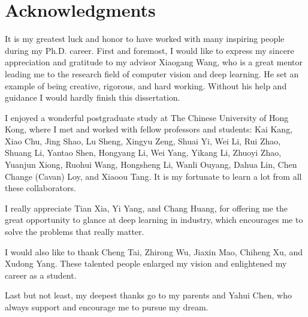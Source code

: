 \chapter*{Acknowledgments}

It is my greatest luck and honor to have worked with many inspiring people during my Ph.D. career. First and foremost, I would like to express my sincere appreciation and gratitude to my advisor Xiaogang Wang, who is a great mentor leading me to the research field of computer vision and deep learning. He set an example of being creative, rigorous, and hard working. Without his help and guidance I would hardly finish this dissertation.

I enjoyed a wonderful postgraduate study at The Chinese University of Hong Kong, where I met and worked with fellow professors and students: Kai Kang, Xiao Chu, Jing Shao, Lu Sheng, Xingyu Zeng, Shuai Yi, Wei Li, Rui Zhao, Shuang Li, Yantao Shen, Hongyang Li, Wei Yang, Yikang Li, Zhuoyi Zhao, Yuanjun Xiong, Ruohui Wang, Hongsheng Li, Wanli Ouyang, Dahua Lin, Chen Change (Cavan) Loy, and Xiaoou Tang. It is my fortunate to learn a lot from all these collaborators.

I really appreciate Tian Xia, Yi Yang, and Chang Huang, for offering me the great opportunity to glance at deep learning in industry, which encourages me to solve the problems that really matter.

I would also like to thank Cheng Tai, Zhirong Wu, Jiaxin Mao, Chiheng Xu, and Xudong Yang. These talented people enlarged my vision and enlightened my career as a student.

Last but not least, my deepest thanks go to my parents and Yahui Chen, who always support and encourage me to pursue my dream.

